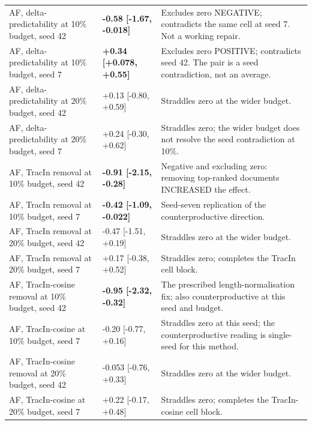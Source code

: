 \documentclass[10pt]{article}
\begin{document}
{\begin{longtable}{ p{4.08cm}lp{7.60cm} }
AF, delta-predictability at 10\% budget, seed 42 & \textbf{ -0.58 [-1.67, -0.018] } & Excludes zero NEGATIVE; contradicts the same cell at seed 7. Not a working repair. \\

AF, delta-predictability at 10\% budget, seed 7 & \textbf{ +0.34 [+0.078, +0.55] } & Excludes zero POSITIVE; contradicts seed 42. The pair is a seed contradiction, not an average. \\

AF, delta-predictability at 20\% budget, seed 42 & +0.13 [-0.80, +0.59] & Straddles zero at the wider budget. \\

AF, delta-predictability at 20\% budget, seed 7 & +0.24 [-0.30, +0.62] & Straddles zero; the wider budget does not resolve the seed contradiction at 10\%. \\

AF, TracIn removal at 10\% budget, seed 42 & \textbf{ -0.91 [-2.15, -0.28] } & Negative and excluding zero: removing top-ranked documents INCREASED the effect. \\

AF, TracIn removal at 10\% budget, seed 7 & \textbf{ -0.42 [-1.09, -0.022] } & Seed-seven replication of the counterproductive direction. \\

AF, TracIn removal at 20\% budget, seed 42 & -0.47 [-1.51, +0.19] & Straddles zero at the wider budget. \\

AF, TracIn removal at 20\% budget, seed 7 & +0.17 [-0.38, +0.52] & Straddles zero; completes the TracIn cell block. \\

AF, TracIn-cosine removal at 10\% budget, seed 42 & \textbf{ -0.95 [-2.32, -0.32] } & The prescribed length-normalisation fix; also counterproductive at this seed and budget. \\

AF, TracIn-cosine at 10\% budget, seed 7 & -0.20 [-0.77, +0.16] & Straddles zero at this seed; the counterproductive reading is single-seed for this method. \\

AF, TracIn-cosine removal at 20\% budget, seed 42 & -0.053 [-0.76, +0.33] & Straddles zero at the wider budget. \\

AF, TracIn-cosine at 20\% budget, seed 7 & +0.22 [-0.17, +0.48] & Straddles zero; completes the TracIn-cosine cell block. \\


\end{longtable}}
\end{document}
